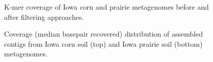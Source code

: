 \documentclass{nature}%
\begin{document}
\newpage

\begin{figure}[ht]
\caption{K-mer coverage of Iowa corn and prairie metagenomes before
  and after filtering approaches.}
\label{diginormcoverage}
\end{figure}

\newpage

\begin{figure}[ht]
\caption{Coverage (median basepair recovered) distribution of assembled contigs
  from Iowa corn soil (top) and Iowa prairie soil (bottom) metagenomes.}
\label{soilassemblycoverage}
\end{figure}
\end{document}
